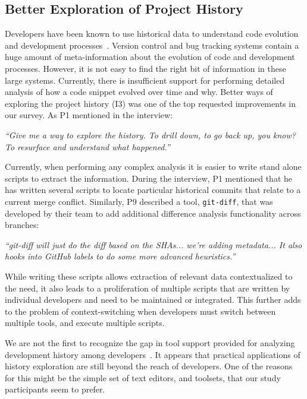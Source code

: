 \subsection{Better Exploration of Project History}
Developers have been known to use historical data to understand code evolution and development processes~\cite{Mihai_lenses}.
Version control and bug tracking systems contain a huge amount of meta-information about the evolution of code and development processes.
However, it is not easy to find the right bit of information in these large systems. 
Currently, there is insufficient support for performing detailed analysis of how a code snippet evolved over time and why. 
Better ways of exploring the project history (I3) was one of the top requested improvements in our survey. 
As P1 mentioned in the interview:
\begin{quoting}
\textit{``Give me a way to explore the history. To drill down, to go back up, you know? To resurface and understand what happened.''}
\end{quoting}


Currently, when performing any complex analysis it is easier to write stand alone scripts to extract the information. 
During the interview, P1 mentioned that he has written several scripts to locate particular historical commits that relate to a current merge conflict. 
Similarly, P9 described a tool, \texttt{git-diff}, that was developed by their team to add additional difference analysis functionality across branches:
\begin{quoting}
\textit{``git-diff will just do the diff based on the SHAs... we're adding metadata... It also hooks into GitHub labels to do some more advanced heuristics.''}
\end{quoting}

While writing these scripts allows extraction of relevant data contextualized to the need, it also leads to a proliferation of multiple scripts that are written by individual developers and need to be maintained or integrated.
This further adds to the problem of context-switching when developers must switch between multiple tools, and execute multiple scripts.

We are not the first to recognize the gap in tool support provided for analyzing development history among developers~\cite{Mihai_lenses, sun2015informationhistory, guo2016cold-start, yan2014miningcontracts}. 
It appears that practical applications of history exploration are still beyond the reach of developers. 
One of the reasons for this might be the simple set of text editors, and toolsets, that our study participants seem to prefer.

